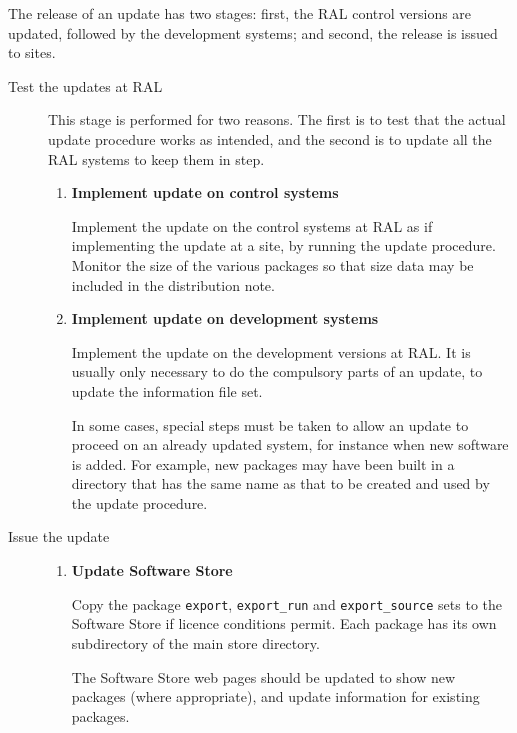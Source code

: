 The release of an update has two stages: first, the RAL control
versions are updated, followed by the development systems; and second,
the release is issued to sites.

\begin{description}

\item[Test the updates at RAL]\mbox{}

This stage is performed for two reasons.  The first is to test that the
actual update procedure works as intended, and the second is to update
all the RAL systems to keep them in step.

\begin{enumerate}

\item{\bf{Implement update on control systems}}

Implement the update on the control systems at RAL as if implementing
the update at a site, by running the update procedure.  Monitor the
size of the various packages so that size data may be included in the
distribution note.

\item{\bf{Implement update on development systems}}

Implement the update on the development versions at RAL.  It is usually
only necessary to do the compulsory parts of an update, to update the
information file set.

In some cases, special steps must be taken to allow an update to
proceed on an already updated system, for instance when new software is
added.  For example, new packages may have been built in a directory
that has the same name as that to be created and used by the update
procedure.

\end{enumerate}

\item[Issue the update]\mbox{}

\begin{enumerate}

\item{\bf{Update Software Store}}

Copy the package {\tt{export}}, {\tt{export\_run}} and
{\tt{export\_source}} sets to the Software Store if licence conditions
permit.  Each package has its own subdirectory of the main store
directory.

The Software Store web pages should be updated to show new packages (where
appropriate), and update information for existing packages.


\end{enumerate}
\end{description}
